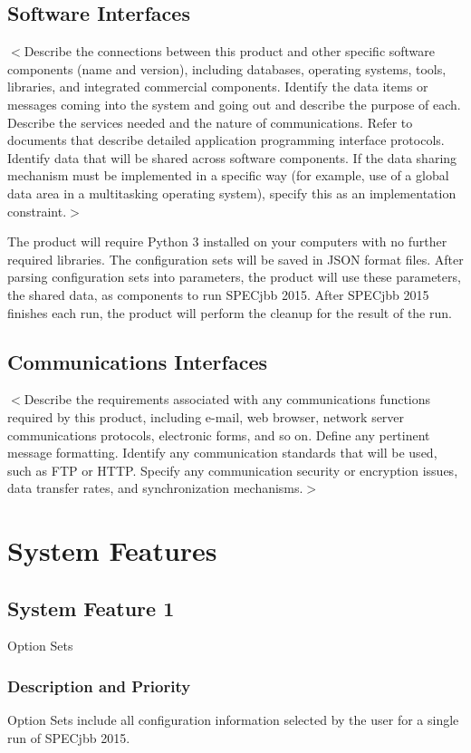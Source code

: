 \documentclass{scrreprt}
\begin{document}
\section{Software Interfaces}
$<$Describe the connections between this product and other specific software 
components (name and version), including databases, operating systems, tools, 
libraries, and integrated commercial components. Identify the data items or 
messages coming into the system and going out and describe the purpose of each.  
Describe the services needed and the nature of communications. Refer to 
documents that describe detailed application programming interface protocols.  
Identify data that will be shared across software components. If the data 
sharing mechanism must be implemented in a specific way (for example, use of a global data area in a multitasking operating system), specify this as an 
implementation constraint.$>$

The product will require Python 3 installed on your computers with no further required libraries. The configuration sets will be saved in JSON format files. After parsing configuration sets into parameters, the product will use these parameters, the shared data, as components to run SPECjbb 2015. After SPECjbb 2015 finishes each run, the product will perform the cleanup for the result of the run.

\section{Communications Interfaces}
$<$Describe the requirements associated with any communications functions 
required by this product, including e-mail, web browser, network server 
communications protocols, electronic forms, and so on. Define any pertinent 
message formatting. Identify any communication standards that will be used, such as FTP or HTTP. Specify any communication security or encryption issues, data transfer rates, and synchronization mechanisms.$>$


\chapter{System Features}

\section{System Feature 1}
Option Sets

\subsection{Description and Priority}
Option Sets include all configuration information selected by the user for a single run of SPECjbb 2015.
\end{document}
